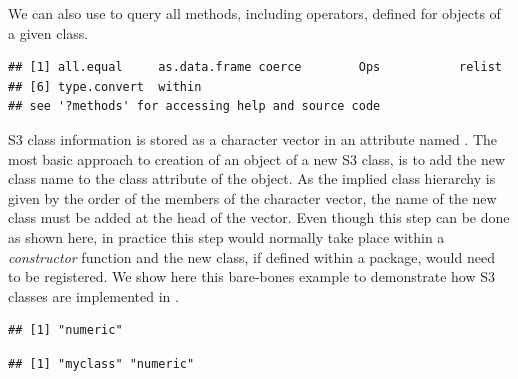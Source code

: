\documentclass[krantz2]{krantz}\usepackage{knitr}
\begin{document}
We can also use  to query all methods, including operators, defined for objects of a given class.

\begin{knitrout}\footnotesize
{}\color{fgcolor}\begin{kframe}
\begin{alltt}
\hlstd{(} \hlstd{=} \hlstd{)}
\end{alltt}
\begin{verbatim}
## [1] all.equal     as.data.frame coerce        Ops           relist       
## [6] type.convert  within       
## see '?methods' for accessing help and source code
\end{verbatim}
\end{kframe}
\end{knitrout}

S3 class information is stored as a character vector in an attribute named . The most basic approach to creation of an object of a new S3 class, is to add the new class name to the class attribute of the object. As the implied class hierarchy is given by the order of the members of the character vector, the name of the new class must be added at the head of the vector. Even though this step can be done as shown here, in practice this step would normally take place within a \emph{constructor} function and the new class, if defined within a package, would need to be registered. We show here this bare-bones example to demonstrate how S3 classes are implemented in \Rlang.

\begin{knitrout}\footnotesize
{}\color{fgcolor}\begin{kframe}
\begin{alltt}
 \hlkwb{<-} 
\end{alltt}
\begin{verbatim}
## [1] "numeric"
\end{verbatim}
\begin{alltt}
 \hlkwb{<-} \hlstd{(}\hlstd{,} 
\end{alltt}
\begin{verbatim}
## [1] "myclass" "numeric"
\end{verbatim}
\end{kframe}
\end{knitrout}
\end{document}
